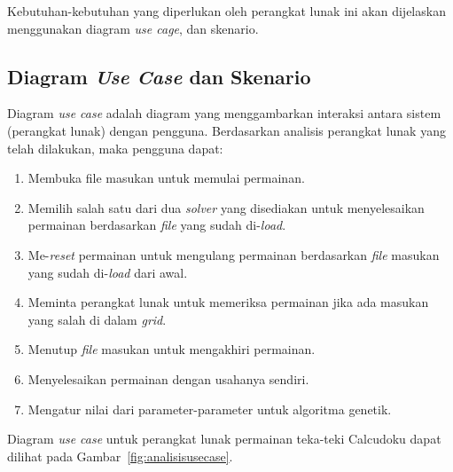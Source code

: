 Kebutuhan-kebutuhan yang diperlukan oleh perangkat lunak ini akan dijelaskan menggunakan diagram \textit{use cage}, dan skenario.

\subsection{Diagram \textit{Use Case} dan Skenario}
\label{sec:analisisusecase}

Diagram \textit{use case} adalah diagram yang menggambarkan interaksi antara sistem (perangkat lunak) dengan pengguna. Berdasarkan analisis perangkat lunak yang telah dilakukan, maka pengguna dapat:

\begin{enumerate}
\item Membuka file masukan untuk memulai permainan.
\item Memilih salah satu dari dua \textit{solver} yang disediakan untuk menyelesaikan permainan berdasarkan \textit{file} yang sudah di-\textit{load}.
\item Me-\textit{reset} permainan untuk mengulang permainan berdasarkan \textit{file} masukan yang sudah di-\textit{load} dari awal.
\item Meminta perangkat lunak untuk memeriksa permainan jika ada masukan yang salah di dalam \textit{grid}.
\item Menutup \textit{file} masukan untuk mengakhiri permainan.
\item Menyelesaikan permainan dengan usahanya sendiri.
\item Mengatur nilai dari parameter-parameter untuk algoritma genetik.
\end{enumerate}

Diagram \textit{use case} untuk perangkat lunak permainan teka-teki Calcudoku dapat dilihat pada Gambar~\ref{fig:analisisusecase}.

